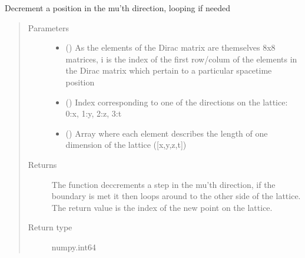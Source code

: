 \documentclass[letterpaper,10pt,english]{sphinxmanual}
\begin{document}

\begin{fulllineitems}
\label{\detokenize{index:su2.mdowni}}
Decrement a position in the mu’th direction, looping if needed
\begin{quote}\begin{description}
\item[{Parameters}] \leavevmode\begin{itemize}
\item {} 
 () \textendash{} As the elements of the Dirac matrix are themselves 8x8
matrices, i is the index of the first row/colum of the elements
in the Dirac matrix which pertain to a particular spacetime
position

\item {} 
 () \textendash{} Index corresponding to one of the directions on the lattice:
0:x, 1:y, 2:z, 3:t

\item {} 
 () \textendash{} Array where each element describes the length of one dimension
of the lattice ({[}x,y,z,t{]})

\end{itemize}

\item[{Returns}] \leavevmode
The function deccrements a step in the mu’th direction, if the
boundary is met it then loops around to the other side of the
lattice. The return value is the index of the new point on the
lattice.

\item[{Return type}] \leavevmode
numpy.int64

\end{description}\end{quote}

\end{fulllineitems}

\end{document}
